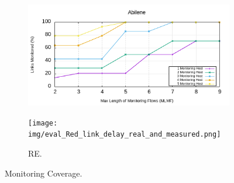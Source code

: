 \documentclass[10pt, journal, letterpaper]{IEEEtran}
\begin{document}
\begin{figure}
    \begin{subfigure}{\columnwidth}
       \centering
        \includegraphics[width=0.8\columnwidth]{img/eval_Abilene_Max_Length_of_Routes_Links_Monitored.png}
        \caption{}
        \label{fig:eval_Abilene_Max_Length_of_Routes_Links_Monitored}
    \end{subfigure}
    \begin{subfigure}{\columnwidth}
      \centering
      \texttt{[image: img/eval\_Red\_link\_delay\_real\_and\_measured.png]}
     \caption{RE.}
     \label{fig:eval_RedIris_Max_Length_of_Routes_Links_Monitored}
    \end{subfigure}
    \caption{Monitoring Coverage.}
    \label{fig:real_delay_abile}
\end{figure}
\end{document}
